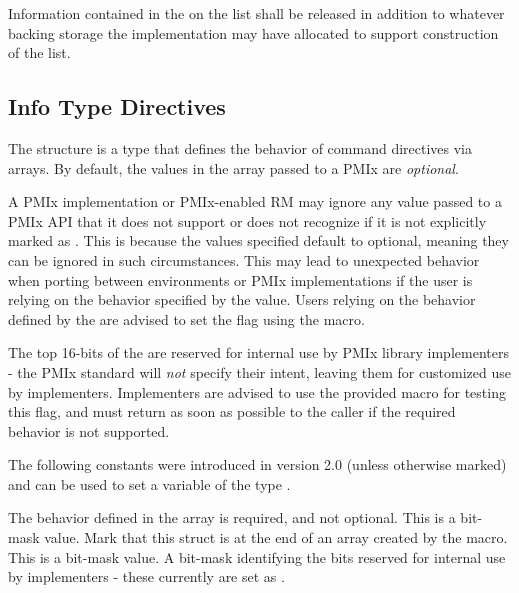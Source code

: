 Information contained in the  on the list shall be released in addition to whatever backing storage the implementation may have allocated to support construction of the list.


\subsection{Info Type Directives}
\label{api:struct:infodirs}

The  structure is a  type that defines the behavior of command directives via  arrays.
By default, the values in the  array passed to a PMIx are \emph{optional}.

\adviceuserstart
A PMIx implementation or PMIx-enabled \ac{RM} may ignore any  value passed to a \ac{PMIx} \ac{API} that it does not support or does not recognize if it is not explicitly marked as .
This is because the values specified default to optional, meaning they can be ignored in such circumstances.
This may lead to unexpected behavior when porting between environments or \ac{PMIx} implementations if the user is relying on the behavior specified by the  value.
Users relying on the behavior defined by the  are advised to set the  flag using the  macro.
\adviceuserend

\adviceimplstart
The top 16-bits of the  are reserved for internal use by \ac{PMIx} library implementers - the \ac{PMIx} standard will \textit{not} specify their intent, leaving them for customized use by implementers. Implementers are advised to use the provided  macro for testing this flag, and must return  as soon as possible to the caller if the required behavior is not supported.
\adviceimplend

The following constants were introduced in version 2.0 (unless otherwise marked) and can be used to set a variable of the type .

\begin{constantdesc}
%
The behavior defined in the  array is required, and not optional. This is a bit-mask value.
%
Mark that this  struct is at the end of an array created by the  macro. This is a bit-mask value.
%
A bit-mask identifying the bits reserved for internal use by implementers - these currently are set as .
%
\end{constantdesc}

